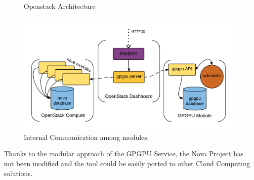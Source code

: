 \documentclass[a4paper,twoside]{article}
\begin{document}
\begin{figure}[htb]
  \centering
   \quad
  \caption{Openstack Architecture}
  \label{fig:os}
\end{figure}

\begin{figure}[htb]
  \centering
  \includegraphics[width=\linewidth]{images/os2.png}
  \caption{Internal Communication among modules.}
  \label{fig:internal}
\end{figure}

Thanks to the modular approach of the GPGPU Service, the Nova Project has not been modified and the tool could be easily ported to other Cloud Computing solutions.
\end{document}
